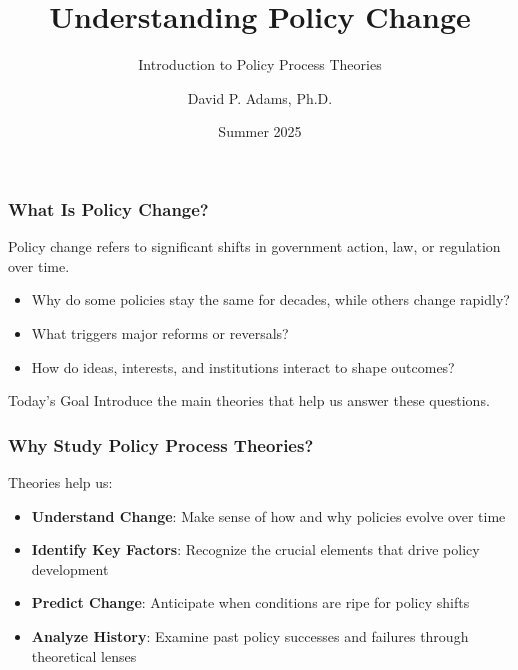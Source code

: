 \documentclass[10pt]{beamer}
\begin{document}
\title{Understanding Policy Change}
\subtitle{Introduction to Policy Process Theories}
\author{David P. Adams, Ph.D.}
\date{Summer 2025}

\maketitle

\begin{frame}
\frametitle{What Is Policy Change?}

Policy change refers to significant shifts in government action, law, or regulation over time.

\vspace{0.5cm}

\begin{itemize}
  \item Why do some policies stay the same for decades, while others change rapidly?
  \item What triggers major reforms or reversals?
  \item How do ideas, interests, and institutions interact to shape outcomes?
\end{itemize}

\vspace{0.5cm}

\begin{alertblock}{Today's Goal}
Introduce the main theories that help us answer these questions.
\end{alertblock}

\end{frame}

\begin{frame}
\frametitle{Why Study Policy Process Theories?}

Theories help us:

\begin{itemize}
  \item \textbf{Understand Change}: Make sense of how and why policies evolve over time
  \item \textbf{Identify Key Factors}: Recognize the crucial elements that drive policy development  
  \item \textbf{Predict Change}: Anticipate when conditions are ripe for policy shifts
  \item \textbf{Analyze History}: Examine past policy successes and failures through theoretical lenses
\end{itemize}

\end{frame}
\end{document}
